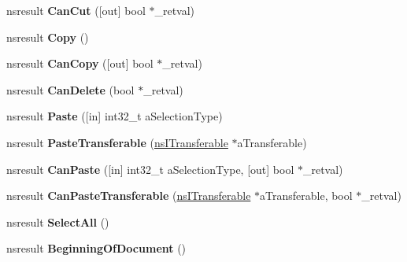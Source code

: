 \begin{DoxyCompactItemize}
nsresult {\bfseries Can\+Cut} (\mbox{[}out\mbox{]} bool $\ast$\+\_\+retval)
\item 
\mbox{\label{interfacens_i_editor_a098ae8430ce17c7a1b384e50cbe275ff}} 
nsresult {\bfseries Copy} ()
\item 
\mbox{\label{interfacens_i_editor_a76e98f0de47a1b3b79a9f4109c72f0c4}} 
nsresult {\bfseries Can\+Copy} (\mbox{[}out\mbox{]} bool $\ast$\+\_\+retval)
\item 
\mbox{\label{interfacens_i_editor_a5d00f47557db59a32f3e79060e721e98}} 
nsresult {\bfseries Can\+Delete} (bool $\ast$\+\_\+retval)
\item 
\mbox{\label{interfacens_i_editor_a3c25430edbea8c0aa65bcc1f19b893bd}} 
nsresult {\bfseries Paste} (\mbox{[}in\mbox{]} int32\+\_\+t a\+Selection\+Type)
\item 
\mbox{\label{interfacens_i_editor_a35a3129a439e1caeb1dae068fd827a3e}} 
nsresult {\bfseries Paste\+Transferable} (\hyperlink{interfacens_i_supports}{ns\+I\+Transferable} $\ast$a\+Transferable)
\item 
\mbox{\label{interfacens_i_editor_ae2088116451ef32da01226dc63f66410}} 
nsresult {\bfseries Can\+Paste} (\mbox{[}in\mbox{]} int32\+\_\+t a\+Selection\+Type, \mbox{[}out\mbox{]} bool $\ast$\+\_\+retval)
\item 
\mbox{\label{interfacens_i_editor_abb784198c41b3d68314b9faf772f76c6}} 
nsresult {\bfseries Can\+Paste\+Transferable} (\hyperlink{interfacens_i_supports}{ns\+I\+Transferable} $\ast$a\+Transferable, bool $\ast$\+\_\+retval)
\item 
\mbox{\label{interfacens_i_editor_ad6f720b2bb0dac4ba842ff8294fabc93}} 
nsresult {\bfseries Select\+All} ()
\item 
\mbox{\label{interfacens_i_editor_ac09aa4ed6162a9f5183ddb5d8d9dabe5}} 
nsresult {\bfseries Beginning\+Of\+Document} ()
\item 
\mbox{\label{interfacens_i_editor_a31c81a921addfe7c0103dba9a6a837a4}} 

\end{DoxyCompactItemize}

